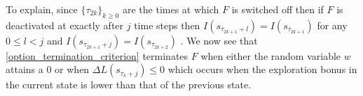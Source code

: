 \documentclass{article}
\begin{document}
To explain, since  $\{\tau_{2k}\}_{k\geq 0}$ are the times at which $F$ is switched off then if  $F$ is deactivated at exactly after $j$ time steps then   $I(s_{\tau_{2k+1}+l})=I(s_{\tau_{2k+1}})$ for any $0\leq l<j$ and $I(s_{\tau_{2k+1}+j})=I(s_{\tau_{2k+2}})$ . We now see that \eqref{option_termination_criterion} terminates $F$ when either the random variable $w$ attains a $0$ or when $\Delta L(s_{\tau_k+j})\leq 0$ which occurs when the exploration bonus in the current state is lower than that of the previous state.  

 
 
	    
\end{document}
